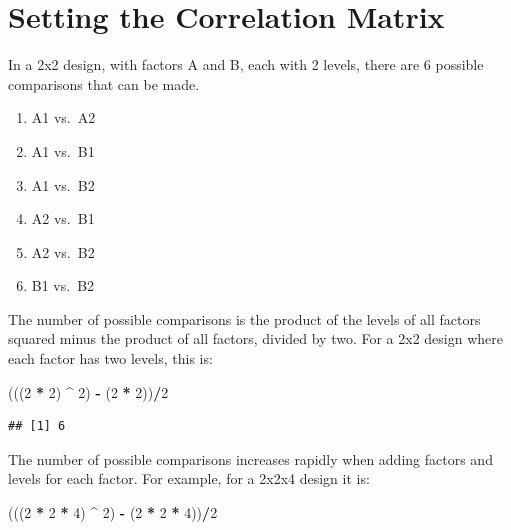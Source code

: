 \documentclass[]{book}
\newenvironment{Shaded}{\begin{snugshade}}{\end{snugshade}}
\newcommand{\DecValTok}[1]{\textcolor[rgb]{0.00,0.00,0.81}{#1}}
\newcommand{\NormalTok}[1]{#1}
\newcommand{\OperatorTok}[1]{\textcolor[rgb]{0.81,0.36,0.00}{\textbf{#1}}}
\newcommand{\StringTok}[1]{\textcolor[rgb]{0.31,0.60,0.02}{#1}}
\providecommand{\tightlist}{%
  \setlength{\itemsep}{0pt}\setlength{\parskip}{0pt}}
\begin{document}
\hypertarget{setting-the-correlation-matrix}{%
\chapter{Setting the Correlation Matrix}\label{setting-the-correlation-matrix}}

In a 2x2 design, with factors A and B, each with 2 levels, there are 6 possible comparisons that can be made.

\begin{enumerate}
\def\labelenumi{\arabic{enumi}.}
\tightlist
\item
  A1 vs.~A2
\item
  A1 vs.~B1
\item
  A1 vs.~B2
\item
  A2 vs.~B1
\item
  A2 vs.~B2
\item
  B1 vs.~B2
\end{enumerate}

The number of possible comparisons is the product of the levels of all factors squared minus the product of all factors, divided by two. For a 2x2 design where each factor has two levels, this is:

\begin{Shaded}
\begin{Highlighting}[]
\NormalTok{(((}\DecValTok{2} \OperatorTok{*}\StringTok{ }\DecValTok{2}\NormalTok{) }\OperatorTok{^}\StringTok{ }\DecValTok{2}\NormalTok{) }\OperatorTok{-}\StringTok{ }\NormalTok{(}\DecValTok{2} \OperatorTok{*}\StringTok{ }\DecValTok{2}\NormalTok{))}\OperatorTok{/}\DecValTok{2}
\end{Highlighting}
\end{Shaded}

\begin{verbatim}
## [1] 6
\end{verbatim}

The number of possible comparisons increases rapidly when adding factors and levels for each factor. For example, for a 2x2x4 design it is:

\begin{Shaded}
\begin{Highlighting}[]
\NormalTok{(((}\DecValTok{2} \OperatorTok{*}\StringTok{ }\DecValTok{2} \OperatorTok{*}\StringTok{ }\DecValTok{4}\NormalTok{) }\OperatorTok{^}\StringTok{ }\DecValTok{2}\NormalTok{) }\OperatorTok{-}\StringTok{ }\NormalTok{(}\DecValTok{2} \OperatorTok{*}\StringTok{ }\DecValTok{2} \OperatorTok{*}\StringTok{ }\DecValTok{4}\NormalTok{))}\OperatorTok{/}\DecValTok{2}
\end{Highlighting}
\end{Shaded}
\end{document}
